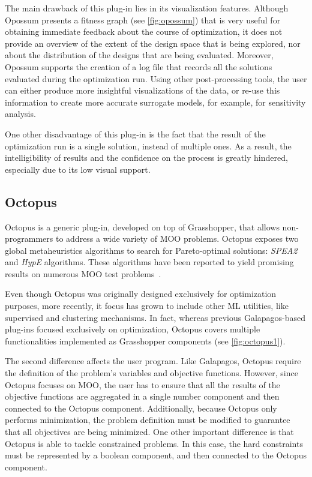 	The main drawback of this plug-in lies in its visualization features. Although Opossum presents a fitness graph (see \cref{fig:opossum}) that is very useful for obtaining immediate feedback about the course of optimization, it does not provide an overview of the extent of the design space that is being explored, nor about the distribution of the designs that are being evaluated. Moreover, Opossum supports the creation of a log file that records all the solutions evaluated during the optimization run. Using other post-processing tools, the user can either produce more insightful visualizations of the data, or re-use this information to create more accurate surrogate models, for example, for sensitivity analysis.
	
	One other disadvantage of this plug-in is the fact that the result of the optimization run is a single solution, instead of multiple ones. As a result, the intelligibility of results and the confidence on the process is greatly hindered, especially due to its low visual support. 
	
	\subsection{Octopus}
	
	Octopus is a generic plug-in, developed on top of Grasshopper, that allows non-programmers to address a wide variety of \ac{MOO} problems. Octopus exposes two global metaheuristics algorithms to search for Pareto-optimal solutions: \textit{\ac{SPEA2}} and \textit{HypE} algorithms. These algorithms have been reported to yield promising results on numerous \ac{MOO} test problems~\cite{Zitzler2001SPEA2,Zitzler2011HypE}. 
	
	Even though Octopus was originally designed exclusively for optimization purposes, more recently, it focus has grown to include other \ac{ML} utilities, like supervised and clustering mechanisms. In fact, whereas previous Galapagos-based plug-ins focused exclusively on optimization, Octopus covers multiple functionalities implemented as Grasshopper components (see \cref{fig:octopus1}).
	
	The second difference affects the user program. Like Galapagos, Octopus require the definition of the problem's variables and objective functions. However, since Octopus focuses on \ac{MOO}, the user has to ensure that all the results of the objective functions are aggregated in a single number component and then connected to the Octopus component. Additionally, because Octopus only performs minimization, the problem definition must be modified to guarantee that all objectives are being minimized. One other important difference is that Octopus is able to tackle constrained problems. In this case, the hard constraints must be represented by a boolean component, and then connected to the Octopus component.
	
